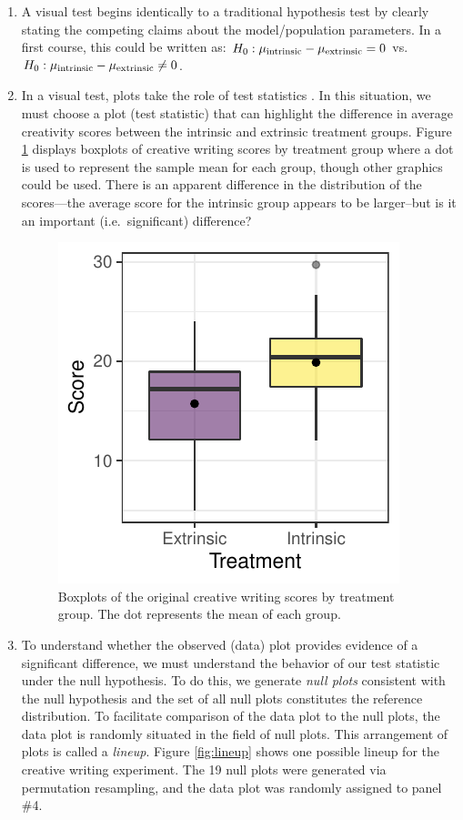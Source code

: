 \documentclass[12pt]{article}
\begin{document}
\begin{enumerate}
\def\labelenumi{\arabic{enumi}.}
\item
  A visual test begins identically to a traditional hypothesis test by
  clearly stating the competing claims about the model/population
  parameters. In a first course, this could be written as:
  \(H_0: \mu_{\rm intrinsic} - \mu_{\rm extrinsic} = 0\)
  vs.~\(H_0: \mu_{\rm intrinsic} - \mu_{\rm extrinsic} \ne 0\).
\item
  In a visual test, plots take the role of test statistics
  \citep{Buja-2009bd}. In this situation, we must choose a plot (test
  statistic) that can highlight the difference in average creativity
  scores between the intrinsic and extrinsic treatment groups. Figure
  \ref{fig:data_plot} displays boxplots of creative writing scores by
  treatment group where a dot is used to represent the sample mean for
  each group, though other graphics could be used. There is an apparent
  difference in the distribution of the scores---the average score for
  the intrinsic group appears to be larger--but is it an important
  (i.e.~significant) difference?

  \begin{figure}
  \centering
  \includegraphics{figs/diff_means_plot.pdf}
  \caption{\label{fig:data_plot} Boxplots of the original creative
  writing scores by treatment group. The dot represents the mean of each
  group.}
  \end{figure}
\item
  To understand whether the observed (data) plot provides evidence of a
  significant difference, we must understand the behavior of our test
  statistic under the null hypothesis. To do this, we generate
  \emph{null plots} consistent with the null hypothesis and the set of
  all null plots constitutes the reference distribution. To facilitate
  comparison of the data plot to the null plots, the data plot is
  randomly situated in the field of null plots. This arrangement of
  plots is called a \emph{lineup}. Figure \ref{fig:lineup} shows one
  possible lineup for the creative writing experiment. The 19 null plots
  were generated via permutation resampling, and the data plot was
  randomly assigned to panel \#4.


\end{enumerate}
\end{document}
